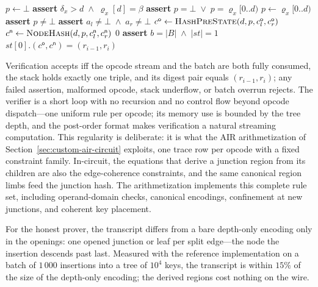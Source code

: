 \documentclass[11pt]{article}
\begin{document}
\begin{algorithm}[t!]
\begin{algorithmic}[0]
          \State $p \gets \bot$
             
              \State \textbf{assert} $\delta_x > d \;\land\; \varrho_x[d] = \beta$
              \State \textbf{assert} $p = \bot \;\lor\; p = \varrho_x[0..d)$
              \State $p \gets \varrho_x[0..d)$
            \EndIf
          \EndFor
          \State \textbf{assert} $p \neq \bot$
           
            \State \textbf{assert} $a_l \neq \bot \;\land\; a_r \neq \bot$
          \EndIf
          \State $c^{\mathsf o} \gets \Call{HashPreState}{d,p,c^{\mathsf o}_l,c^{\mathsf o}_r}$
          \State $c^{\mathsf n} \gets \Call{NodeHash}{d,p,c^{\mathsf n}_l,c^{\mathsf n}_r}$
          \State {}
        \Else
          \State \Return $0$ 
        \EndIf
      \EndFor
      \State \textbf{assert} $b = |B| \;\land\; |\mathit{st}| = 1$
      \State \Return $\mathit{st}[0].(c^{\mathsf o}, c^{\mathsf n}) = (r_{i-1}, r_i)$
    \EndFunction
  \end{algorithmic}
\end{algorithm}

Verification accepts iff the opcode stream and the batch are both fully consumed, the stack holds exactly one triple, and its digest pair equals $(r_{i-1}, r_i)$; any failed assertion, malformed opcode, stack underflow, or batch overrun rejects. The verifier is a short loop with no recursion and no control flow beyond opcode dispatch---one uniform rule per opcode; its memory use is bounded by the tree depth, and the post-order format makes verification a natural streaming computation. This regularity is deliberate: it is what the AIR arithmetization of Section~\ref{sec:custom-air-circuit} exploits, one trace row per opcode with a fixed constraint family. In-circuit, the equations that derive a junction region from its children are also the edge-coherence constraints, and the same canonical region limbs feed the junction hash. The arithmetization implements this complete rule set, including operand-domain checks, canonical encodings, confinement at new junctions, and coherent key placement.

For the honest prover, the transcript differs from a bare depth-only encoding only in the openings: one opened junction or leaf per split edge---the node the insertion descends past last. Measured with the reference implementation on a batch of $1\,000$ insertions into a tree of $10^4$ keys, the transcript is within $15\%$ of the size of the depth-only encoding; the derived regions cost nothing on the wire.
\end{document}
